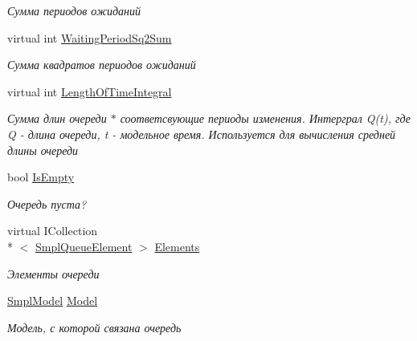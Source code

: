 \begin{DoxyCompactItemize}
\begin{DoxyCompactList}\small\item\em Сумма периодов ожиданий \end{DoxyCompactList}\item 
virtual int \hyperlink{class_s_m_p_l_sharp_1_1_objects_1_1_smpl_queue_aadbd85e6bd504c71fb38c568c771c49b}{Waiting\-Period\-Sq2\-Sum}
\begin{DoxyCompactList}\small\item\em Сумма квадратов периодов ожиданий \end{DoxyCompactList}\item 
virtual int \hyperlink{class_s_m_p_l_sharp_1_1_objects_1_1_smpl_queue_a157275049efc507053a44cbd72d7ba2f}{Length\-Of\-Time\-Integral}
\begin{DoxyCompactList}\small\item\em Сумма длин очереди $\ast$ соответсвующие периоды изменения. Интерграл Q(t), где Q -\/ длина очереди, t -\/ модельное время. Используется для вычисления средней длины очереди \end{DoxyCompactList}\item 
bool \hyperlink{class_s_m_p_l_sharp_1_1_objects_1_1_smpl_queue_a740725209155ade0c50d3e259967dbd1}{Is\-Empty}
\begin{DoxyCompactList}\small\item\em Очередь пуста? \end{DoxyCompactList}\item 
virtual I\-Collection\\*
$<$ \hyperlink{class_s_m_p_l_sharp_1_1_objects_1_1_smpl_queue_element}{Smpl\-Queue\-Element} $>$ \hyperlink{class_s_m_p_l_sharp_1_1_objects_1_1_smpl_queue_a615e74aa9a4f6d4c82468cafcf20bc71}{Elements}
\begin{DoxyCompactList}\small\item\em Элементы очереди \end{DoxyCompactList}\item 
\hyperlink{class_s_m_p_l_sharp_1_1_smpl_model}{Smpl\-Model} \hyperlink{class_s_m_p_l_sharp_1_1_objects_1_1_smpl_queue_a4fd05b0b855d569bd43a71c738b9bb7f}{Model}
\begin{DoxyCompactList}\small\item\em Модель, с которой связана очередь \end{DoxyCompactList}\end{DoxyCompactItemize}


